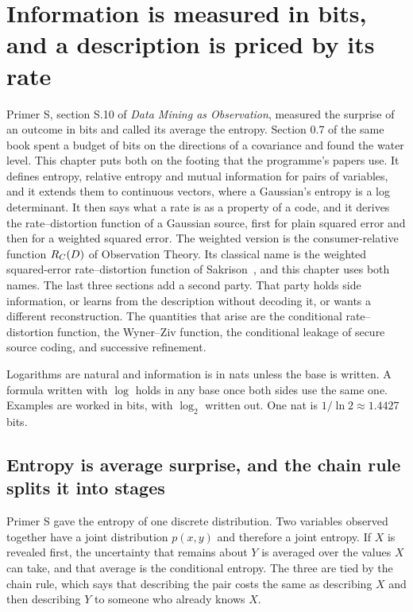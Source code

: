 \chapter{Information is measured in bits, and a description is priced by its rate}\label{ch03}

Primer S, section S.10 of \emph{Data Mining as Observation}, measured the surprise of an outcome in bits and called its average the entropy. Section 0.7 of the same book spent a budget of bits on the directions of a covariance and found the water level. This chapter puts both on the footing that the programme's papers use. It defines entropy, relative entropy and mutual information for pairs of variables, and it extends them to continuous vectors, where a Gaussian's entropy is a log determinant. It then says what a rate is as a property of a code, and it derives the rate--distortion function of a Gaussian source, first for plain squared error and then for a weighted squared error. The weighted version is the consumer-relative function $R_C(D)$ of Observation Theory. Its classical name is the weighted squared-error rate--distortion function of Sakrison~\cite{sakrison1968}, and this chapter uses both names. The last three sections add a second party. That party holds side information, or learns from the description without decoding it, or wants a different reconstruction. The quantities that arise are the conditional rate--distortion function, the Wyner--Ziv function, the conditional leakage of secure source coding, and successive refinement.

Logarithms are natural and information is in nats unless the base is written. A formula written with $\log$ holds in any base once both sides use the same one. Examples are worked in bits, with $\log_2$ written out. One nat is $1/\ln 2\approx1.4427$ bits.

\section{Entropy is average surprise, and the chain rule splits it into stages}\label{sec:ch03:entropy}

Primer S gave the entropy of one discrete distribution. Two variables observed together have a joint distribution $p(x,y)$ and therefore a joint entropy. If $X$ is revealed first, the uncertainty that remains about $Y$ is averaged over the values $X$ can take, and that average is the conditional entropy. The three are tied by the chain rule, which says that describing the pair costs the same as describing $X$ and then describing $Y$ to someone who already knows $X$.

